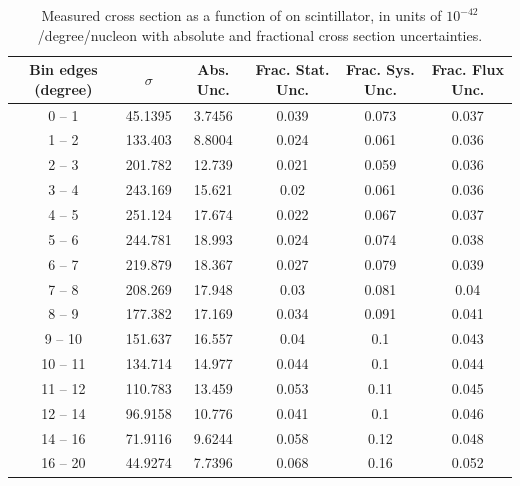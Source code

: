 \documentclass[aps,prl,twocolumn,showpacs,superscriptaddress,letterpaper,showkeys,superscriptaddress,floatfix,nofootinbib]{revtex4-1}
\begin{document}
\begin{table}[H]
  \centering
  \renewcommand{\arraystretch}{1.15}
  \caption{Measured cross section as a function of \thmu on scintillator, in units of $10^{-42}$ \cmsq/degree/nucleon with absolute and fractional cross section uncertainties.}
    \begin{tabular}{c||c|c||c|c|c}
      Bin edges (degree) &  $\sigma$  &  Abs. Unc.  &  Frac. Stat. Unc.  &  Frac. Sys. Unc.  &  Frac. Flux Unc. \\
      \hline
      \hline
        0 -- 1 & 45.1395 & 3.7456 & 0.039 & 0.073 & 0.037\\
        1 -- 2 & 133.403 & 8.8004 & 0.024 & 0.061 & 0.036\\
        2 -- 3 & 201.782 & 12.739 & 0.021 & 0.059 & 0.036\\
        3 -- 4 & 243.169 & 15.621 & 0.02 & 0.061 & 0.036\\
        4 -- 5 & 251.124 & 17.674 & 0.022 & 0.067 & 0.037\\
        5 -- 6 & 244.781 & 18.993 & 0.024 & 0.074 & 0.038\\
        6 -- 7 & 219.879 & 18.367 & 0.027 & 0.079 & 0.039\\
        7 -- 8 & 208.269 & 17.948 & 0.03 & 0.081 & 0.04\\
        8 -- 9 & 177.382 & 17.169 & 0.034 & 0.091 & 0.041\\
        9 -- 10 & 151.637 & 16.557 & 0.04 & 0.1 & 0.043\\
        10 -- 11 & 134.714 & 14.977 & 0.044 & 0.1 & 0.044\\
        11 -- 12 & 110.783 & 13.459 & 0.053 & 0.11 & 0.045\\
        12 -- 14 & 96.9158 & 10.776 & 0.041 & 0.1 & 0.046\\
        14 -- 16 & 71.9116 & 9.6244 & 0.058 & 0.12 & 0.048\\
        16 -- 20 & 44.9274 & 7.7396 & 0.068 & 0.16 & 0.052\\
    \end{tabular}
  \label{tbl:CrossSectionthetamu}
\end{table}
\end{document}

